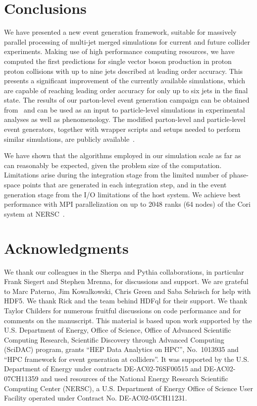 \documentclass[aps,prd,twocolumn,fleqn,superscriptaddress,groupedaddress,nofootinbib,preprintnumbers]{revtex4}
\begin{document}
\section{Conclusions}
\label{sec:conclusions}
We have presented a new event generation framework, suitable for massively
parallel processing of multi-jet merged simulations for current and future
collider experiments. Making use of high performance computing resources,
we have computed the first predictions for single vector boson production
in proton proton collisions with up to nine jets described at leading order
accuracy. This presents a significant improvement of the currently available
simulations, which are capable of reaching leading order accuracy for only
up to six jets in the final state. The results of our parton-level event
generation campaign can be obtained from~\cite{schulz_holger_2019_2678039,
  schulz_holger_2019_2678055,schulz_holger_2019_2678091}
and can be used as an input to particle-level simulations in experimental
analyses as well as phenomenology.
The modified parton-level and particle-level event generators,
together with wrapper scripts and setups needed to perform
similar simulations, are publicly available~\cite{hpcgenrepo}.

We have shown that the algorithms employed in our simulation scale as far
as can reasonably be expected, given the problem size of the computation.
Limitations arise during the integration stage from the limited number
of phase-space points that are generated in each integration step, and
in the event generation stage from the I/O limitations of the host system.
We achieve best performance with MPI parallelization on up to 2048 ranks
(64 nodes) of the Cori system at NERSC~\cite{cori}.
\vspace*{2mm}

\section*{Acknowledgments}
We thank our colleagues in the Sherpa and Pythia collaborations, in
particular Frank Siegert and Stephen Mrenna, for discussions and support.
We are grateful to Marc Paterno, Jim Kowalkowski, Chris Green and
Saba Sehrisch for help with HDF5. We thank Rick and the team behind
HDFql for their support.
We thank Taylor Childers for numerous fruitful discussions
on code performance and for comments on the manuscript.
This material is based upon work supported by the U.S. Department of Energy,
Office of Science, Office of Advanced Scientific Computing Research,
Scientific Discovery through Advanced Computing (SciDAC) program,
grants ``HEP Data Analytics on HPC'', No.~1013935 and
``HPC framework for event generation at colliders''. %
It was supported by the U.S. Department of Energy under contracts
DE-AC02-76SF00515 and DE-AC02-07CH11359 and used resources of the
National Energy Research Scientific Computing Center (NERSC),
a U.S. Department of Energy Office of Science User Facility
operated under Contract No. DE-AC02-05CH11231.


\end{document}
